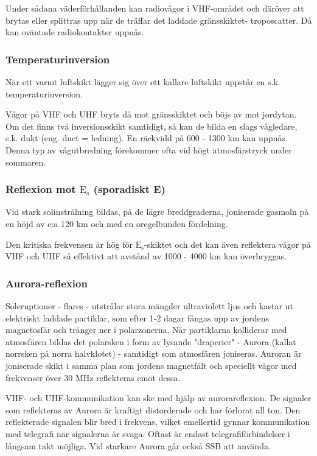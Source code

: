 Under sådana väderförhållanden kan radiovågor i VHF-området och
däröver att brytas eller splittras upp när de träffar det laddade
gränsskiktet- troposcatter. Då kan oväntade radiokontakter uppnås.

\subsubsection{Temperaturinversion}

När ett varmt luftskikt lägger sig över ett kallare luftskikt uppstår
en s.k. temperaturinversion.

Vågor på VHF och UHF bryts då mot gränsskiktet och böjs av mot
jordytan. Om det finns två inversionsskikt samtidigt, så kan de bilda
en slags vågledare, s.k. dukt (eng. duct = ledning). En räckvidd på
600 - 1300 km kan uppnås. Denna typ av vågutbredning förekommer ofta
vid högt atmosfärstryck under sommaren.

\subsubsection{Reflexion mot \(\mathrm{E_s}\) (sporadiskt E)}

Vid stark solinstrålning bildas, på de lägre breddgraderna, joniserade
gasmoln på en höjd av c:a 120 km och med en oregelbunden fördelning.

Den kritiska frekvensen är hög för \(\mathrm{E_s}\)-skiktet och det
kan även reflektera vågor på VHF och UHF så effektivt att avstånd av
1000 - 4000 km kan överbryggas.

\subsubsection{Aurora-reflexion}

Soleruptioner - flares - utstrålar stora mängder ultraviolett ljus och
kastar ut elektriskt laddade partiklar, som efter 1-2 dagar fångas upp
av jordens magnetosfär och tränger ner i polarzonerna. När partiklarna
kolliderar med atmosfären bildas det polarsken i form av lysande
"draperier" - Aurora (kallat norrsken på norra halvklotet) - samtidigt
som atmosfären joniseras. Auroran är joniserade skikt i samma plan som
jordens magnetfält och speciellt vågor med frekvenser över 30 MHz
reflekteras emot dessa.

VHF- och UHF-kommunikation kan ske med hjälp av aurorareflexion. De
signaler som reflekteras av Aurora är kraftigt distorderade och har
förlorat all ton. Den reflekterade signalen blir bred i frekvens,
vilket emellertid gynnar kommunikation med telegrafi när signalerna är
svaga. Oftast är endast telegrafiförbindelser i långsam takt möjliga.
Vid starkare Aurora går också SSB att använda.

